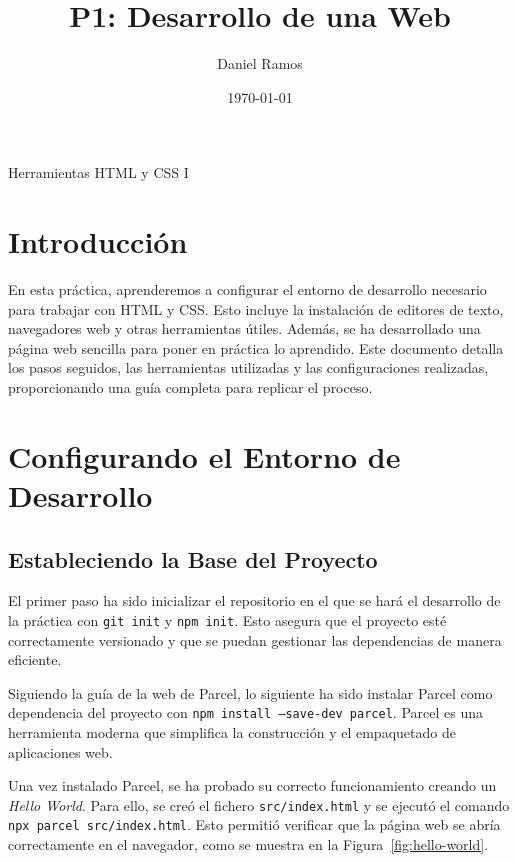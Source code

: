 \documentclass{article}
\title{P1: Desarrollo de una Web}
\author{Daniel Ramos}
\date{\today}
\begin{document}
\maketitle

\begin{center}
    \large Herramientas HTML y CSS I
\end{center}

\newpage

\tableofcontents

\newpage

\section*{Introducción}

En esta práctica, aprenderemos a configurar el entorno de desarrollo necesario para trabajar con HTML y CSS. Esto incluye la instalación de editores de texto, navegadores web y otras herramientas útiles. Además, se ha desarrollado una página web sencilla para poner en práctica lo aprendido. Este documento detalla los pasos seguidos, las herramientas utilizadas y las configuraciones realizadas, proporcionando una guía completa para replicar el proceso.

\newpage

\section{Configurando el Entorno de Desarrollo}\label{sec:configurando-el-entorno-de-desarrollo}

\subsection{Estableciendo la Base del Proyecto}\label{subsec:estableciendo-la-base-del-proyecto}

El primer paso ha sido inicializar el repositorio en el que se hará el desarrollo de la práctica con \texttt{git init} y \texttt{npm init}. Esto asegura que el proyecto esté correctamente versionado y que se puedan gestionar las dependencias de manera eficiente.

Siguiendo la guía de la web de Parcel, lo siguiente ha sido instalar Parcel como dependencia del proyecto con \texttt{npm install --save-dev parcel}. Parcel es una herramienta moderna que simplifica la construcción y el empaquetado de aplicaciones web.

Una vez instalado Parcel, se ha probado su correcto funcionamiento creando un \textit{Hello World}. Para ello, se creó el fichero \texttt{src/index.html} y se ejecutó el comando \texttt{npx parcel src/index.html}. Esto permitió verificar que la página web se abría correctamente en el navegador, como se muestra en la Figura~\ref{fig:hello-world}.
\end{document}
